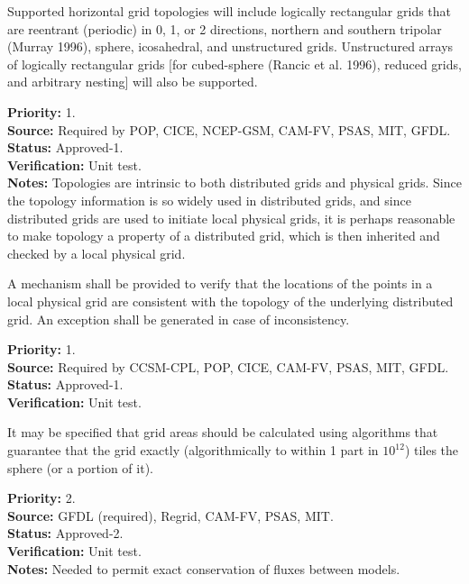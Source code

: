  Supported horizontal grid topologies will include
logically rectangular grids that are reentrant (periodic) in 0, 1, or 2 directions,
northern and southern tripolar (Murray 1996), sphere, icosahedral, and unstructured
grids.  Unstructured arrays of logically rectangular grids [for cubed-sphere (Rancic
et al. 1996), reduced grids, and arbitrary nesting] will also be supported.
\begin{reqlist}
{\bf Priority:} 1. \\
{\bf Source:} Required by POP, CICE, NCEP-GSM,
CAM-FV, PSAS, MIT, GFDL.  \\
{\bf Status:} Approved-1. \\
{\bf Verification:} Unit test.\\
{\bf Notes:}  Topologies are intrinsic to both distributed grids and physical grids.  Since
the topology information is so widely used in distributed grids, and since distributed grids
are used to initiate local physical grids, it is perhaps reasonable to make topology a
property of a distributed grid, which is then inherited and checked by a local physical grid.
\end{reqlist}

A mechanism shall be provided to verify that the locations of the points in
a local physical grid are consistent with the topology of the underlying distributed grid.  An
exception shall be generated in case of inconsistency.
\begin{reqlist}
{\bf Priority:} 1. \\
{\bf Source:} Required by CCSM-CPL, POP, CICE, 
CAM-FV, PSAS, MIT, GFDL.  \\
{\bf Status:} Approved-1. \\
{\bf Verification:} Unit test.
\end{reqlist}

It may be specified that grid areas should be calculated using algorithms that
guarantee that the grid exactly (algorithmically to within 1 part in $10^{12}$) tiles
the sphere (or a portion of it). 
\begin{reqlist}
{\bf Priority:} 2. \\
{\bf Source:} GFDL (required), Regrid, CAM-FV, PSAS, MIT.  \\
{\bf Status:} Approved-2. \\
{\bf Verification:} Unit test.\\
{\bf Notes:} Needed to permit exact conservation of fluxes between models.
\end{reqlist}

